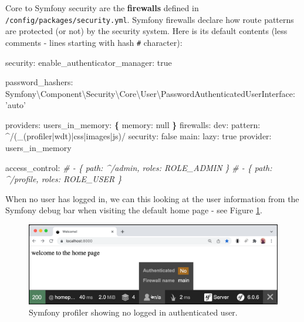 \documentclass[a4paperpaper,openright]{book}
\newenvironment{Shaded}{}{}
\newcommand{\AttributeTok}[1]{\textcolor[rgb]{0.49,0.56,0.16}{#1}}
\newcommand{\CharTok}[1]{\textcolor[rgb]{0.25,0.44,0.63}{#1}}
\newcommand{\CommentTok}[1]{\textcolor[rgb]{0.38,0.63,0.69}{\textit{#1}}}
\newcommand{\FunctionTok}[1]{\textcolor[rgb]{0.02,0.16,0.49}{#1}}
\newcommand{\KeywordTok}[1]{\textcolor[rgb]{0.00,0.44,0.13}{\textbf{#1}}}
\newcommand{\StringTok}[1]{\textcolor[rgb]{0.25,0.44,0.63}{#1}}
\begin{document}
Core to Symfony security are the \textbf{firewalls} defined in
\texttt{/config/packages/security.yml}. Symfony firewalls declare how
route patterns are protected (or not) by the security system. Here is
its default contents (less comments - lines starting with hash
\texttt{\#} character):

\begin{Shaded}
\begin{Highlighting}[]
    \FunctionTok{security:}
        \FunctionTok{enable_authenticator_manager:}\AttributeTok{ }\CharTok{true}

        \FunctionTok{password_hashers:}
            \FunctionTok{Symfony\textbackslash{}Component\textbackslash{}Security\textbackslash{}Core\textbackslash{}User\textbackslash{}PasswordAuthenticatedUserInterface:}\AttributeTok{ }\StringTok{'auto'}

        \FunctionTok{providers:}
            \FunctionTok{users_in_memory:}\AttributeTok{ }\KeywordTok{\{} \FunctionTok{memory:}\AttributeTok{ }\CharTok{null}\AttributeTok{ }\KeywordTok{\}}
        \FunctionTok{firewalls:}
            \FunctionTok{dev:}
                \FunctionTok{pattern:}\AttributeTok{ ^/(_(profiler|wdt)|css|images|js)/}
                \FunctionTok{security:}\AttributeTok{ }\CharTok{false}
            \FunctionTok{main:}
                \FunctionTok{lazy:}\AttributeTok{ }\CharTok{true}
                \FunctionTok{provider:}\AttributeTok{ users_in_memory}

        \FunctionTok{access_control:}
            \CommentTok{# - \{ path: ^/admin, roles: ROLE_ADMIN \}}
            \CommentTok{# - \{ path: ^/profile, roles: ROLE_USER \}}
\end{Highlighting}
\end{Shaded}

When no user has logged in, we can this looking at the user information
from the Symfony debug bar when visiting the default home page - see
Figure \ref{no_user}.

\begin{figure}
\centering
\includegraphics{./tex2pdf.-40a8cafc9587c9a0/776c1c4f283b0377be72c3956d13a16b81069fd4.png}
\caption{Symfony profiler showing no logged in authenticated user.
\label{no_user}}
\end{figure}
\end{document}
